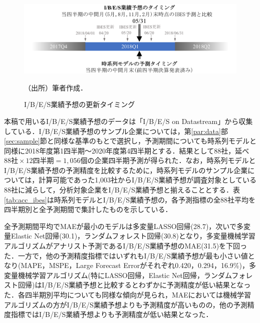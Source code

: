 \documentclass[a4paper，11pt]{jsarticle}
\begin{document}
\begin{figure}[tbp]
  \centering
  \caption{I/B/E/S業績予想の更新タイミング}
  \label{fig:ibes_timing}
  \includegraphics[width=0.60\linewidth]{./img/_ibes_timing.pdf}
  \begin{threeparttable}
  \begin{tablenotes}
    \item[]（出所）筆者作成．
  \end{tablenotes}
  \end{threeparttable}
\end{figure}

本稿で用いるI/B/E/S業績予想のデータは「I/B/E/S on Datastream」から収集している．I/B/E/S業績予想のサンプル企業については，第\ref{par:data}部\ref{sec:sample}節と同様な基準のもとで選択し，予測期間についても時系列モデルと同様に2018年度第1四半期～2020年度第4四半期とする．結果として88社，延べ $88社 \times 12四半期 = 1,056個$の企業四半期予測が得られた．なお，時系列モデルとI/B/E/S業績予想の予測精度を比較するために，時系列モデルのサンプル企業については，計算可能であった1,003社からI/B/E/S業績予想が調査対象としている88社に減らして，分析対象企業をI/B/E/S業績予想と揃えることとする．表\ref{tab:acc_ibes}は時系列モデルとI/B/E/S業績予想の，各予測指標の全88社平均を四半期別と全予測期間で集計したものを示している．

全予測期間平均でMAEが最小のモデルは多変量LASSO回帰(28.7)，次いで多変量Elastic Net回帰(30.1)，ランダムフォレスト回帰(30.8)となり，多変量機械学習アルゴリズムがアナリスト予測であるI/B/E/S業績予想のMAE(31.5)を下回った．一方で，他の予測精度指標ではいずれもI/B/E/S業績予想が最も小さい値となり(MAPE，MSPE，Large Forecast Errorがそれぞれ0.420，0.294，16.9\%)，多変量機械学習アルゴリズム(特にLASSO回帰，Elastic Net回帰，ランダムフォレスト回帰)はI/B/E/S業績予想と比較するとわずかに予測精度が低い結果となった．各四半期別平均についても同様な傾向が見られ，MAEにおいては機械学習アルゴリズムの方がI/B/E/S業績予想よりも予測精度が高いものの，他の予測精度指標ではI/B/E/S業績予想よりも予測精度が低い結果となった．

\end{document}
